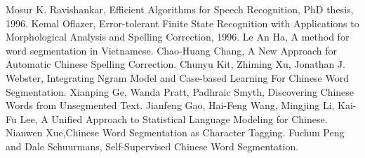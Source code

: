 \documentclass[a4paper]{book}
\begin{document}
\begin{thebibliography}{99}
Mosur K. Ravishankar, Efficient Algorithms for
  Speech Recognition, PhD thesis, 1996.
Kemal Oflazer, Error-tolerant Finite State
  Recognition with Applications to Morphological Analysis and Spelling
  Correction, 1996.
Le An Ha, A method for word segmentation in
  Vietnamese.
Chao-Huang Chang, A New Approach for
  Automatic Chinese Spelling Correction. 
Chunyu Kit, Zhiming Xu, Jonathan
  J. Webster, Integrating Ngram Model and Case-based Learning For
  Chinese Word Segmentation.
Xianping Ge, Wanda Pratt,
  Padhraic Smyth, Discovering Chinese Words from Unsegmented Text.
Jianfeng Gao, Hai-Feng Wang, Mingjing Li, Kai-Fu
  Lee, A Unified Approach to Statistical Language Modeling for
  Chinese.
\bibitem{}Nianwen Xue,Chinese Word Segmentation as Character Tagging.
\bibitem{}Fuchun Peng and Dale Schuurmans, Self-Supervised Chinese
  Word Segmentation.
\end{thebibliography}
\end{document}
